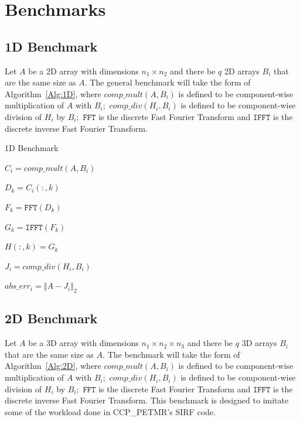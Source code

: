 \documentclass[a4]{article}
\newcommand{\norm}[1]{\left\Vert#1\right\Vert}
\begin{document}
\section{Benchmarks}
\subsection{1D Benchmark}
Let $A$ be a 2D array with dimensions $n_1\times n_2$ and there be $q$ 
2D arrays $B_i$ that are the same size as $A.$  The general benchmark will take the form of 
Algorithm~\ref{Alg:1D}, where $comp\_mult(A,B_i)$ is defined to be 
component-wise multiplication of $A$ with $B_i;$  $comp\_div(H_i,B_i)$ 
is defined to be component-wise division of $H_i$ by $B_i;$ $\texttt{FFT}$ 
is the discrete Fast Fourier Transform and $\texttt{IFFT}$ is the 
discrete inverse Fast Fourier Transform.


\begin{algorithm}\caption{1D Benchmark}\label{Alg:1D}
\noindent \hrulefill

\begin{algorithmic}



\STATE $C_i = comp\_mult(A,B_i)$



\STATE $D_k = C_i(:,k)$

\STATE $F_k = \texttt{FFT}(D_k)$


\STATE $G_k = \texttt{IFFT}(F_k)$

\STATE $H(:,k) = G_k$

\ENDIF


\ENDFOR


\STATE $J_i = comp\_div(H_i,B_i) $

\STATE $abs\_err_i = \norm{A-J_i}_2$

\ENDIF

\ENDFOR

\end{algorithmic}
\noindent \hrulefill

\end{algorithm}

\subsection{2D Benchmark}
Let $A$ be a 3D array with dimensions $n_1\times n_2\times n_3$ and there be $q$ 
3D arrays $B_i$ that are the same size as $A.$  The benchmark will take the form of 
Algorithm~\ref{Alg:2D}, where $comp\_mult(A,B_i)$ is defined to be 
component-wise multiplication of $A$ with $B_i;$  $comp\_div(H_i,B_i)$ 
is defined to be component-wise division of $H_i$ by $B_i;$ $\texttt{FFT}$ 
is the discrete Fast Fourier Transform and $\texttt{IFFT}$ is the 
discrete inverse Fast Fourier Transform. This benchmark is designed to imitate 
some of the workload done in CCP\_PETMR's SIRF code.
\end{document}
